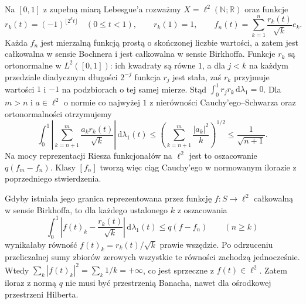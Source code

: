 \begin{przyklad}
\label{ex:birkhoff-q-incomplete15b}
Na $[0,1]$ z zupełną miarą Lebesgue'a rozważmy
$X=\ell^2(\mathbb N;\mathbb R)$ oraz funkcje
\[
 r_k(t)=(-1)^{\lfloor 2^k t\rfloor}\quad(0\le t<1),
 \qquad r_k(1)=1,\qquad
 f_n(t)=\sum_{k=1}^n\frac{r_k(t)}{\sqrt{k}}e_k.
\]
Każda $f_n$ jest mierzalną funkcją prostą o skończonej
liczbie wartości, a zatem jest całkowalna w sensie Bochnera i
jest całkowalna w sensie Birkhoffa.
Funkcje $r_k$ są ortonormalne w $L^2([0,1])$:
ich kwadraty są równe $1$, a dla $j<k$
na każdym przedziale diadycznym długości $2^{-j}$
funkcja $r_j$ jest stała, zaś $r_k$ przyjmuje
wartości $1$ i $-1$ na podzbiorach o tej samej
mierze. Stąd $\int_0^1r_jr_k\,\mathrm d\lambda_1=0$.
Dla $m>n$ i $a\in\ell^2$ o normie co najwyżej $1$
z nierówności Cauchy'ego--Schwarza oraz ortonormalności
otrzymujemy
\[
 \int_0^1\left|\sum_{k=n+1}^m
             \frac{a_k r_k(t)}{\sqrt{k}}\right|\,
             \mathrm d\lambda_1(t)
 \le\left(\sum_{k=n+1}^m\frac{|a_k|^2}{k}\right)^{1/2}
 \le\frac{1}{\sqrt{n+1}}.
\]
Na mocy reprezentacji Riesza funkcjonałów na
$\ell^2$ jest to oszacowanie $q(f_m-f_n)$.
Klasy $[f_n]$ tworzą więc ciąg Cauchy'ego
w normowanym ilorazie z poprzedniego stwierdzenia.

Gdyby istniała jego granica reprezentowana przez
funkcję $f:S\to\ell^2$ całkowalną w sensie Birkhoffa,
to dla każdego ustalonego $k$ z oszacowania
\[
 \int_0^1\left|f(t)_k-\frac{r_k(t)}{\sqrt{k}}\right|
       \,\mathrm d\lambda_1(t)
 \le q(f-f_n)\qquad(n\ge k)
\]
wynikałaby równość $f(t)_k=r_k(t)/\sqrt{k}$
prawie wszędzie. Po odrzuceniu przeliczalnej sumy
zbiorów zerowych wszystkie te równości zachodzą
jednocześnie. Wtedy
$\sum_k|f(t)_k|^2=\sum_k1/k=+\infty$,
co jest sprzeczne z $f(t)\in\ell^2$.
Zatem iloraz z normą $q$ nie musi być przestrzenią
Banacha, nawet dla ośrodkowej przestrzeni Hilberta.
\end{przyklad}

